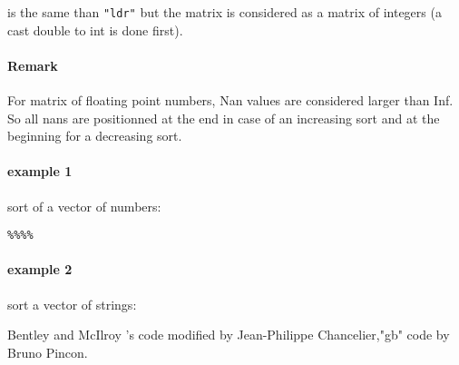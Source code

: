\begin{mandescription}
is the same than \verb+"ldr"+ but the matrix is considered as a matrix
of integers (a cast double to int is done first).

\paragraph{Remark}
For matrix of floating point numbers, Nan values are considered larger
than Inf. So all nans are positionned at the end in case of an
increasing sort and at the beginning for a decreasing sort. 


\end{mandescription}

\begin{examples}

\paragraph{example 1} sort of a vector of numbers:
\begin{program}\verb+%+\verb+%+\verb+%+\verb+%+
\end{program}

\paragraph{example 2} sort a vector of strings:
\begin{program}
\end{program}
\end{examples}

\begin{manseealso}
\end{manseealso}

\begin{authors}
Bentley and McIlroy 's code modified by Jean-Philippe Chancelier,"gb"
code by Bruno Pincon.
\end{authors}
